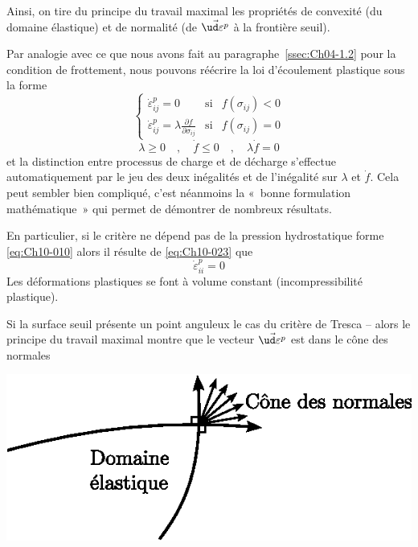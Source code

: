 Ainsi, on tire du principe du travail maximal les propriétés de convexité (du domaine élastique) et de normalité (de $\vec{\ud \varepsilon^p}$ à la frontière seuil). 

Par analogie avec ce que nous avons fait au paragraphe~\ref{ssec:Ch04-1.2} pour la condition de frottement, nous pouvons réécrire la loi d'écoulement plastique sous la forme 
\begin{equation}
    \left\{
    \begin{aligned}
        \dot{\varepsilon}_{ij}^p = 0 & \text{si} & f\left( \sigma_{ij} \right) < 0 \\
        \dot{\varepsilon}_{ij}^p = \lambda \frac{\partial f}{\partial \sigma_{ij}} & \text{si} & f\left( \sigma_{ij} \right) = 0
    \end{aligned}
    \right.
    \label{eq:Ch10-023}
\end{equation}
\[
\lambda \geq 0 \quad,\quad \dot{f} \leq 0 \quad,\quad \lambda \dot{f} = 0
\]
et la distinction entre processus de charge et de décharge s'effectue automatiquement par le jeu des deux inégalités et de l'inégalité sur $\lambda$ et $\dot{f}$.
Cela peut sembler bien compliqué, c'est néanmoins la «~bonne formulation mathématique~» qui permet de démontrer de nombreux résultats. 

En particulier, si le critère ne dépend pas de la pression hydrostatique forme \eqref{eq:Ch10-010} alors il résulte de \eqref{eq:Ch10-023} que 
\begin{equation}
    \dot{\varepsilon}_{ii}^p = 0
    \label{eq:Ch10-024}
\end{equation}
Les déformations plastiques se font à volume constant (incompressibilité plastique). 

Si la surface seuil présente un point anguleux le cas du critère de Tresca -- alors le principe du travail maximal montre que le vecteur $\vec{\ud \varepsilon^p}$ est dans le cône des normales  
\begin{center}
    \includegraphics{../images/T1_Ch10-11}
\end{center}

